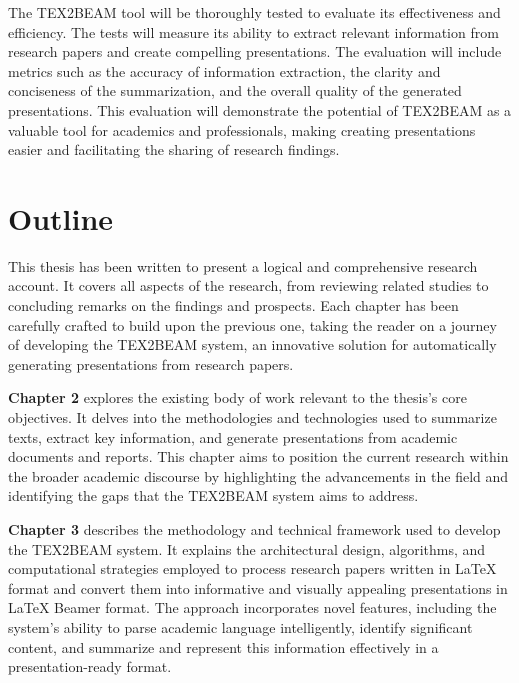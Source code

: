 The TEX2BEAM tool will be thoroughly tested to evaluate its effectiveness and efficiency. The tests will measure its ability to extract relevant information from research papers and create compelling presentations. The evaluation will include metrics such as the accuracy of information extraction, the clarity and conciseness of the summarization, and the overall quality of the generated presentations. This evaluation will demonstrate the potential of TEX2BEAM as a valuable tool for academics and professionals, making creating presentations easier and facilitating the sharing of research findings.


\section{Outline}
\label{sec:intro:outline}


This thesis has been written to present a logical and comprehensive research account. It covers all aspects of the research, from reviewing related studies to concluding remarks on the findings and prospects. Each chapter has been carefully crafted to build upon the previous one, taking the reader on a journey of developing the TEX2BEAM system, an innovative solution for automatically generating presentations from research papers.

\textbf{Chapter 2} explores the existing body of work relevant to the thesis's core objectives. It delves into the methodologies and technologies used to summarize texts, extract key information, and generate presentations from academic documents and reports. This chapter aims to position the current research within the broader academic discourse by highlighting the advancements in the field and identifying the gaps that the TEX2BEAM system aims to address.

\textbf{Chapter 3} describes the methodology and technical framework used to develop the TEX2BEAM system. It explains the architectural design, algorithms, and computational strategies employed to process research papers written in \LaTeX{} format and convert them into informative and visually appealing presentations in \LaTeX{} Beamer format. The approach incorporates novel features, including the system's ability to parse academic language intelligently, identify significant content, and summarize and represent this information effectively in a presentation-ready format.

